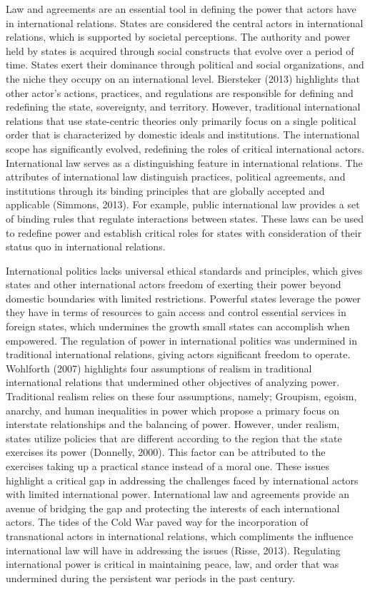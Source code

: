 \documentclass[11pt]{article}
\begin{document}
Law and agreements are an essential tool in defining the power that actors have in international relations. States are considered the central actors in international relations, which is supported by societal perceptions. The authority and power held by states is acquired through social constructs that evolve over a period of time. States exert their dominance through political and social organizations, and the niche they occupy on an international level. Biersteker (2013) highlights that other actor’s actions, practices, and regulations are responsible for defining and redefining the state, sovereignty, and territory. However, traditional international relations that use state-centric theories only primarily focus on a single political order that is characterized by domestic ideals and institutions. The international scope has significantly evolved, redefining the roles of critical international actors. International law serves as a distinguishing feature in international relations. The attributes of international law distinguish practices, political agreements, and institutions through its binding principles that are globally accepted and applicable (Simmons, 2013). For example, public international law provides a set of binding rules that regulate interactions between states. These laws can be used to redefine power and establish critical roles for states with consideration of their status quo in international relations.

International politics lacks universal ethical standards and principles, which gives states and other international actors freedom of exerting their power beyond domestic boundaries with limited restrictions. Powerful states leverage the power they have in terms of resources to gain access and control essential services in foreign states, which undermines the growth small states can accomplish when empowered. The regulation of power in international politics was undermined in traditional international relations, giving actors significant freedom to operate. Wohlforth (2007) highlights four assumptions of realism in traditional international relations that undermined other objectives of analyzing power. Traditional realism relies on these four assumptions, namely; Groupism, egoism, anarchy, and human inequalities in power which propose a primary focus on interstate relationships and the balancing of power. However, under realism, states utilize policies that are different according to the region that the state exercises its power (Donnelly, 2000). This factor can be attributed to the exercises taking up a practical stance instead of a moral one. These issues highlight a critical gap in addressing the challenges faced by international actors with limited international power. International law and agreements provide an avenue of bridging the gap and protecting the interests of each international actors. The tides of the Cold War paved way for the incorporation of transnational actors in international relations, which compliments the influence international law will have in addressing the issues (Risse, 2013). Regulating international power is critical in maintaining peace, law, and order that was undermined during the persistent war periods in the past century.
\end{document}
